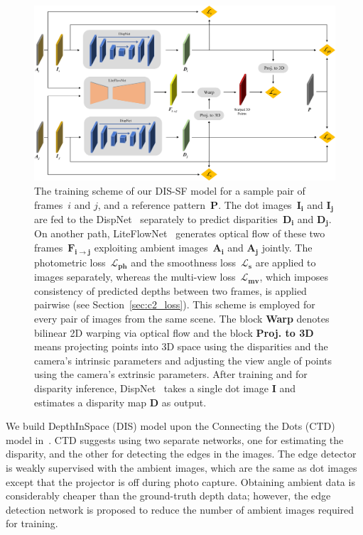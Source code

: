 \begin{figure}[t]
    \begin{center}
        \includegraphics[width=1.0\linewidth]{images/chapter2/figures/Fig1.jpg}
    \end{center}
   \caption{The training scheme of our DIS-SF model for a sample pair of frames~$i$ and $j$, and a reference pattern~$\boldsymbol{P}$. The dot images~$\boldsymbol{I_i}$ and $\boldsymbol{I_j}$ are fed to the DispNet~\cite{mayer2016large} separately to predict disparities~$\boldsymbol{D_i}$ and $\boldsymbol{D_j}$. On another path, LiteFlowNet~\cite{hui2018liteflownet} generates optical flow of these two frames~$\boldsymbol{F_{i \rightarrow j}}$ exploiting ambient images~$\boldsymbol{A_i}$ and $\boldsymbol{A_j}$ jointly. The photometric loss~$\boldsymbol{\mathcal{L}_{ph}}$ and the smoothness loss~$\boldsymbol{\mathcal{L}_s}$ are applied to images separately, whereas the multi-view loss~$\boldsymbol{\mathcal{L}_{mv}}$, which imposes consistency of predicted depths between two frames, is applied pairwise (see Section~\ref{sec:c2_loss}). This scheme is employed for every pair of images from the same scene. The block \textbf{Warp} denotes bilinear 2D warping via optical flow and the block \textbf{Proj. to 3D} means projecting points into 3D space using the disparities and the camera's intrinsic parameters and adjusting the view angle of points using the camera's extrinsic parameters. After training and for disparity inference, DispNet~\cite{mayer2016large} takes a single dot image $\boldsymbol{I}$ and estimates a disparity map $\boldsymbol{D}$ as output.}
    \label{fig:c2_single}
\end{figure}

We build DepthInSpace (DIS) model upon the Connecting the Dots (CTD) model in~\cite{riegler2019connecting}. CTD suggests using two separate networks, one for estimating the disparity, and the other for detecting the edges in the images. The edge detector is weakly supervised with the ambient images, which are the same as dot images except that the projector is off during photo capture. Obtaining ambient data is considerably cheaper than the ground-truth depth data; however, the edge detection network is proposed to reduce the number of ambient images required for training.

